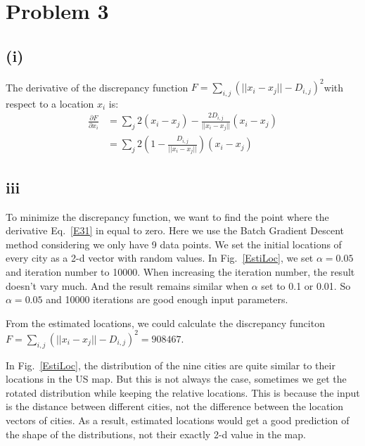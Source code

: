 \documentclass[twoside,11pt]{homework}
\date{\today} %
\begin{document}
\maketitle

\section*{Problem 3}
\color{black}
\subsection*{(i)}
The derivative of the discrepancy function $F = \sum_{i, j} (||x_i - x_j||-D_{i,j})^2$with respect to a location $x_i$ is:
%
\begin{equation}
\begin{split}
\frac{\partial F}{\partial x_i} &= \sum_{j} 2(x_i - x_j) - \frac{2D_{i,j}}{||x_i - x_j||}(x_i - x_j) \\
&=\sum_{j} 2(1-\frac{D_{i,j}}{||x_i - x_j||})(x_i - x_j) 
\end{split}
\label{E31}
\end{equation}
 
 \newpage
 \subsection*{iii}
 To minimize the discrepancy function, we want to find the point where the derivative Eq.~\ref{E31} in equal to zero.
 Here we use the Batch Gradient Descent method considering we only have 9 data points.
 We set the initial locations of every city as a 2-d vector with random values.
In Fig.~\ref{EstiLoc}, we set $\alpha = 0.05$ and iteration number to 10000.
When increasing the iteration number, the result doesn't vary much.
And the result remains similar when $\alpha $ set to 0.1 or 0.01.
So  $\alpha = 0.05$  and 10000 iterations are good enough input parameters.

From the estimated locations, we could calculate the discrepancy funciton $F = \sum_{i, j} (||x_i - x_j||-D_{i,j})^2 = 908467$.

In Fig.~\ref{EstiLoc}, the distribution of the nine cities are quite similar to their locations in the US map.
But this is not always the case, sometimes we get the rotated distribution while keeping the relative locations.
This is because the input is the distance between different cities, not the difference between the location vectors of cities.
As a result, estimated locations would get a good prediction of the shape of the distributions, not their exactly 2-d value in the map.
\end{document}
